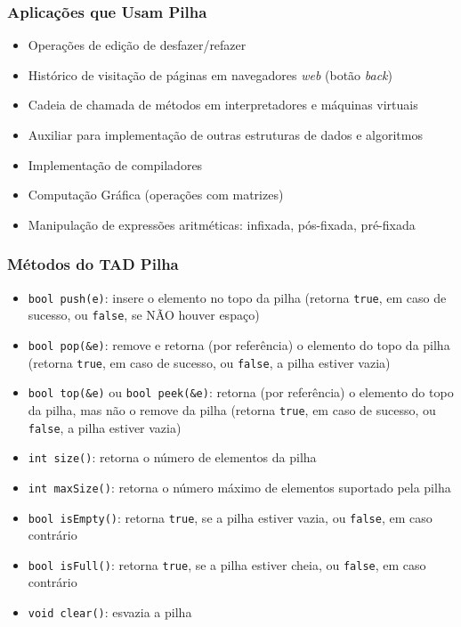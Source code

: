 \documentclass[aspectratio=169]{beamer}
\begin{document}
\begin{frame}\frametitle{Aplicações que Usam Pilha}
\begin{itemize}
	\item Operações de edição de desfazer/refazer
	\item Histórico de visitação de páginas em navegadores \emph{web} (botão \emph{back})
	\item Cadeia de chamada de métodos em interpretadores e máquinas virtuais
	\item Auxiliar para implementação de outras estruturas de dados e algoritmos
	\item Implementação de compiladores
	\item Computação Gráfica (operações com matrizes)
	\item Manipulação de expressões aritméticas: infixada, pós-fixada, pré-fixada %
\end{itemize}
\end{frame}

\begin{frame}\frametitle{Métodos do TAD Pilha}
\begin{itemize}
	\item \texttt{bool push(e)}: insere o elemento no topo da pilha (retorna \texttt{true}, em caso de sucesso, ou \texttt{false}, se NÃO houver espaço)
	\item \texttt{bool pop(\&e)}: remove e retorna (por referência) o elemento do topo da pilha (retorna \texttt{true}, em caso de sucesso, ou \texttt{false}, a pilha estiver vazia)
	\item \texttt{bool top(\&e)} ou \texttt{bool peek(\&e)}: retorna (por referência) o elemento do topo da pilha, mas não o remove da pilha (retorna \texttt{true}, em caso de sucesso, ou \texttt{false}, a pilha estiver vazia)
	\item \texttt{int size()}: retorna o número de elementos da pilha
	\item \texttt{int maxSize()}: retorna o número máximo de elementos suportado pela pilha
	\item \texttt{bool isEmpty()}: retorna \texttt{true}, se a pilha estiver vazia, ou \texttt{false}, em caso contrário
	\item \texttt{bool isFull()}: retorna \texttt{true}, se a pilha estiver cheia, ou \texttt{false}, em caso contrário
	\item \texttt{void clear()}: esvazia a pilha
\end{itemize}
\end{frame}
\end{document}
